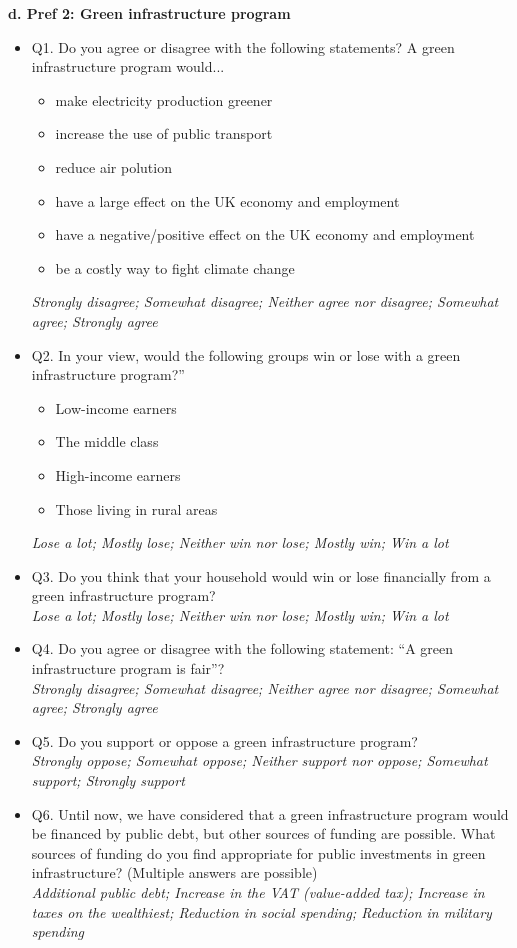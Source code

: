 \documentclass{article}
\begin{document}
\begin{flushleft}
\textbf{d. Pref 2: Green infrastructure program}
\end{flushleft}

\begin{itemize}
    \item Q1. Do you agree or disagree with the following statements? A green infrastructure program would... 
    \begin{itemize}
        \item make electricity production greener
        \item increase the use of public transport
        \item reduce air polution
        \item have a large effect on the UK economy and employment
        \item have a negative/positive effect on the UK economy and employment
        \item be a costly way to fight climate change
    \end{itemize}
    \textit{Strongly disagree; Somewhat disagree; Neither agree nor disagree; Somewhat agree; Strongly agree}
    \item Q2. In your view, would the following groups win or lose with a green infrastructure program?''
    \begin{itemize}
        \item Low-income earners
        \item The middle class
        \item High-income earners
        \item Those living in rural areas
    \end{itemize}
    \textit{Lose a lot; Mostly lose; Neither win nor lose; Mostly win; Win a lot}
    \item Q3. Do you think that your household would win or lose financially from a green infrastructure program? \\
    \textit{Lose a lot; Mostly lose; Neither win nor lose; Mostly win; Win a lot}
    \item Q4. Do you agree or disagree with the following statement: ``A green infrastructure program is fair''? \\
    \textit{Strongly disagree; Somewhat disagree; Neither agree nor disagree; Somewhat agree; Strongly agree}
    \item Q5. Do you support or oppose a green infrastructure program? \\
    \textit{Strongly oppose; Somewhat oppose; Neither support nor oppose; Somewhat support; Strongly support}
    \item Q6. Until now, we have considered that a green infrastructure program would be financed by public debt, but other sources of funding are possible.
    What sources of funding do you find appropriate for public investments in green infrastructure? (Multiple answers are possible) \\
    \textit{Additional public debt; Increase in the VAT (value-added tax); Increase in taxes on the wealthiest; Reduction in social spending; Reduction in military spending}   
\end{itemize}
\end{document}
